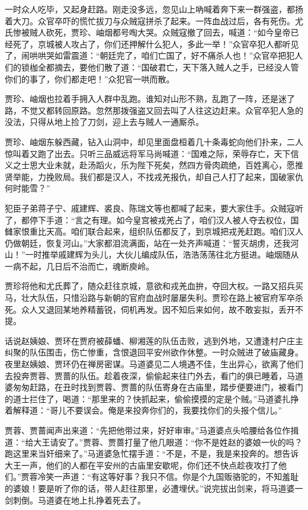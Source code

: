 \documentclass[12pt,oneside]{book}
\begin{document}
一时众人吃毕，又起身赶路。刚走没多远，忽见山上吶喊着奔下来一群强盗，都扬着大刀。众官卒吓的慌忙拔刀与众贼寇拼杀了起来。一阵血战过后，各有死伤。尤氏惨被贼人砍死，贾珍、岫烟都号啕大哭。众贼寇撤了回去，喊道：“如今皇帝已经死了，京城被人攻占了，你们还押解什么犯人，多此一举！”众官卒犯人都听见了，闹哄哄哭如雷震道：“朝廷完了，咱们亡国了，好不痛杀人也！”众官卒把犯人们的锁枷全都摘去，要他们散了道：“国破君亡，天下落入贼人之手，已经没人管你们的事了，你们都走吧！”众犯官一哄而散。

贾珍、岫烟也拉着手拥入人群中乱跑。谁知对山形不熟，乱跑了一阵，还是迷了路，不觉又都转回原路。忽然那拨强盗又回去叫了人往这边赶来。众官卒犯人急的没法，只得从地上捡了刀剑，迎上去与贼人一通厮杀。

贾珍、岫烟东躲西藏，钻入山洞中，却见里面盘桓着几十条毒蛇向他们扑来，二人惊叫着又跑了出去。只听三品威远将军马尚喊道：“国难之际，荣辱存亡，天下信义之士思大业未就，赴汤蹈火，乐为陛下死矣，然四方骨肉疏绝，百姓离心，愿推贤举能，力挽败局。我们都是汉人，不找戎羌报仇，却自己人打了起来，国破家仇何时能雪？”

犯臣子弟蒋子宁、戚建辉、裘良、陈瑞文等也都喊了起来，要大家住手。众贼寇听了，都停下手道：“言之有理。如今皇宫被戎羌占了，咱们汉人被人夺去权位，国雠家恨重比天高。咱们联合起来，组织队伍都反了，到京城把戎羌赶跑。咱们汉人仍做朝廷，恢复河山。”大家都泪流满面，站在一处齐声喊道：“誓灭胡虏，还我河山！”一时推举戚建辉为头儿，大伙儿编成队伍，浩浩荡荡往北方挺进。岫烟随从一病不起，几日后不治而亡，魂断庾岭。

贾珍将他和尤氏葬了，随众赶往京城，意欲和戎羌血拚，夺回大权。一路又招兵买马，壮大队伍，只惜沿路与新朝的官府血战时屡屡失利。贾珍在路上被官府军卒杀死。众人又退回某地养精蓄锐，伺机再发。因不知后来如何，故不敢妄拟，丢开不提。

话说赵姨娘、贾环在贾府被薛蟠、柳湘莲的队伍击败，逃到外地，又遭逢村户庄主纠聚的队伍围击，伤亡惨重，含恨退回平安州欲作休整。一时众贼进了破庙藏身。夜里赵姨娘、贾环仍在禅房密谋。马道婆见二人境遇不佳，生出异心，欲离了他们去投奔贾蓉、贾蔷的队伍。趁着夜深，偷偷起来往门外去，看门的俱已睡着，马道婆匆匆赶路，在丑时找到贾蓉、贾蔷的队伍寄身在古庙里，踏步便要进门，被看门的道士拦住了，喝道：“那里来的？快抓起来，偷偷摸摸的定是个贼。”马道婆扎挣着解释道：“哥儿不要误会。俺是来投奔你们的，我要找你们的头报个信儿。”

贾蓉、贾蔷闻声出来道：“先把他带过来，好好审审。”马道婆点头哈腰给各位作揖道：“给大王请安了。”贾蓉、贾蔷打量了他几眼道：“你不是姓赵的婆娘一伙的吗？跑这里来当奸细来了。”马道婆急忙摆手道：“不是，不是，我是来投奔的。想告诉大王一声，他们的人都在平安州的古庙里安歇呢，你们还不快点趁夜攻打了他们。”贾蓉冷笑一声道：“有这等好事？我只不信。你是个九国贩骆驼的，不知羞耻的婆娘！要是听了你的话，带人赶往那里，必遭埋伏。”说完拔出剑来，将马道婆一剑刺倒。马道婆在地上扎挣着死去了。
\end{document}
